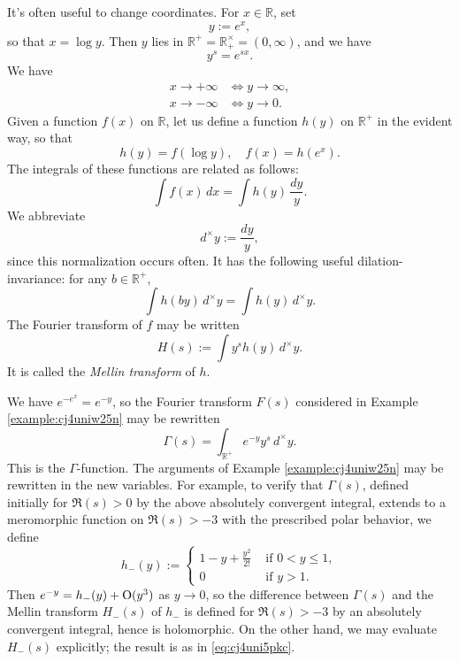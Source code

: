 \documentclass[reqno]{amsart}  \numberwithin{theorem}{section} \numberwithin{equation}{section}
\begin{document}
It's often useful to change coordinates.  For $x \in \mathbb{R}$, set
\begin{equation*}
y := e^x,
\end{equation*}
so that $x = \log y$.  Then $y$ lies in $\mathbb{R}^+ = \mathbb{R}^\times_+ = (0,\infty)$, and we have
\begin{equation*}
y^s = e^{s x}.
\end{equation*}
We have
\begin{align*}
x \rightarrow +\infty &\iff y \rightarrow \infty, \\
x \rightarrow -\infty &\iff y \rightarrow 0.
\end{align*}
Given a function $f(x)$ on $\mathbb{R}$, let us define a function $h(y)$ on $\mathbb{R}^+$ in the evident way, so that
\begin{equation*}
h(y) = f(\log y), \quad f(x) = h(e^x).
\end{equation*}
The integrals of these functions are related as follows:
\begin{equation*}
\int f(x) \, d x = \int h(y) \, \frac{d y}{y}.
\end{equation*}
We abbreviate
\begin{equation*}
  d^\times y := \frac{d y}{y},
\end{equation*}
since this normalization occurs often.  It has the following useful dilation-invariance: for any $b \in \mathbb{R}^+$,
\begin{equation*}
\int h(b y) \,d^\times y = \int h(y) \,d^\times y.
\end{equation*}
The Fourier transform of $f$ may be written
\begin{equation*}
H(s) := \int y^s h(y) \,d^\times y.
\end{equation*}
It is called the \emph{Mellin transform} of $h$.

\begin{example}
  We have $e^{- e^x } = e^{- y}$, so the Fourier transform $F(s)$ considered in Example \ref{example:cj4uniw25n} may be rewritten
  \begin{equation*}
\Gamma(s) = \int_{\mathbb{R}^+} e^{- y } y^s \,d^\times y.
  \end{equation*}
  This is the $\Gamma$-function.  The  arguments of Example \ref{example:cj4uniw25n} may be rewritten in the new variables.  For example, to verify that $\Gamma(s)$, defined initially for $\Re(s) > 0$ by the above absolutely convergent integral, extends to a meromorphic function on $\Re(s) > -3$ with the prescribed polar behavior, we define
  \begin{equation*}
h_-(y) :=
\begin{cases}
1 - y + \frac{y^2}{2!} & \text{ if } 0 < y \leq 1, \\
0 & \text{ if } y > 1.
\end{cases}
  \end{equation*}
  Then $e^{-y} = h_-(y) + \operatorname{O}(y^3)$ as $y \rightarrow 0$, so the difference between $\Gamma(s)$ and the Mellin transform $H_-(s)$ of $h_-$ is defined for $\Re(s) > -3$ by an absolutely convergent integral, hence is holomorphic.  On the other hand, we may evaluate $H_-(s)$ explicitly; the result is as in \eqref{eq:cj4uni5pkc}.
\end{example}
\end{document}
